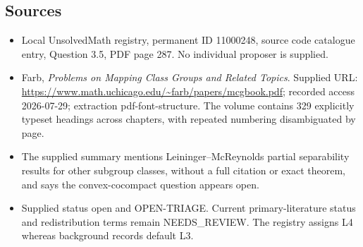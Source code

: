 \documentclass[11pt]{article}
\begin{document}
\subsection{Sources}
\begin{itemize}
\item Local UnsolvedMath registry, permanent ID 11000248, source code catalogue entry, Question 3.5, PDF page 287. No individual proposer is supplied.
\item Farb, \emph{Problems on Mapping Class Groups and Related Topics}. Supplied URL: \url{https://www.math.uchicago.edu/~farb/papers/mcgbook.pdf}; recorded access 2026-07-29; extraction pdf-font-structure. The volume contains 329 explicitly typeset headings across chapters, with repeated numbering disambiguated by page.
\item The supplied summary mentions Leininger--McReynolds partial separability results for other subgroup classes, without a full citation or exact theorem, and says the convex-cocompact question appears open.
\item Supplied status open and OPEN-TRIAGE. Current primary-literature status and redistribution terms remain NEEDS\_REVIEW. The registry assigns L4 whereas background records default L3.
\end{itemize}
\end{document}
